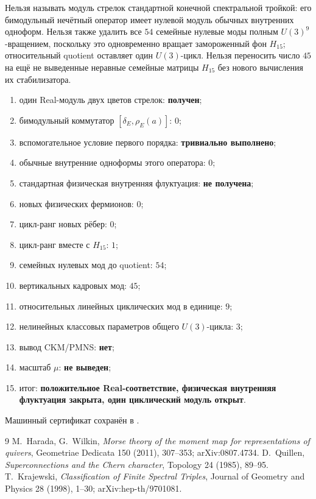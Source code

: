 \begin{nogocriterion}
Нельзя называть модуль стрелок стандартной конечной спектральной тройкой:
его бимодульный нечётный оператор имеет нулевой модуль обычных внутренних
одноформ. Нельзя также удалить все $54$ семейные нулевые моды полным
$U(3)^9$-вращением, поскольку это одновременно вращает замороженный фон
$H_{15}$; относительный quotient оставляет один $U(3)$-цикл.
Нельзя переносить число $45$ на ещё не выведенные неравные семейные матрицы
$H_{15}$ без нового вычисления их стабилизатора.
\end{nogocriterion}

\begin{protocol}
\begin{enumerate}
 \item один Real-модуль двух цветов стрелок: \textbf{получен};
 \item бимодульный коммутатор $[\delta_E,\rho_E(a)]$: \textbf{$0$};
 \item вспомогательное условие первого порядка: \textbf{тривиально выполнено};
 \item обычные внутренние одноформы этого оператора: \textbf{$0$};
 \item стандартная физическая внутренняя флуктуация: \textbf{не получена};
 \item новых физических фермионов: \textbf{$0$};
 \item цикл-ранг новых рёбер: \textbf{$0$};
 \item цикл-ранг вместе с $H_{15}$: \textbf{$1$};
 \item семейных нулевых мод до quotient: \textbf{$54$};
 \item вертикальных кадровых мод: \textbf{$45$};
 \item относительных линейных циклических мод в единице: \textbf{$9$};
 \item нелинейных классовых параметров общего $U(3)$-цикла: \textbf{$3$};
 \item вывод CKM/PMNS: \textbf{нет};
 \item масштаб $\mu$: \textbf{не выведен};
 \item итог: \textbf{положительное Real-соответствие, физическая внутренняя
 флуктуация закрыта, один циклический модуль открыт}.
\end{enumerate}
\end{protocol}

Машинный сертификат сохранён в
.

\begin{thebibliography}{9}
M.~Harada, G.~Wilkin,
\emph{Morse theory of the moment map for representations of quivers},
Geometriae Dedicata 150 (2011), 307--353; arXiv:0807.4734.
D.~Quillen,
\emph{Superconnections and the Chern character},
Topology 24 (1985), 89--95.
T.~Krajewski,
\emph{Classification of Finite Spectral Triples},
Journal of Geometry and Physics 28 (1998), 1--30;
arXiv:hep-th/9701081.
\end{thebibliography}